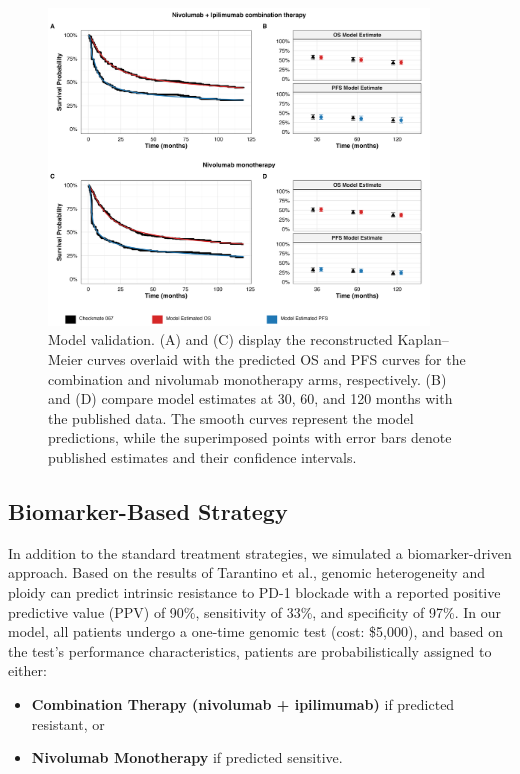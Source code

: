 \documentclass[preprint, 3p,
authoryear]{elsarticle} %
\begin{document}
\begin{figure}[h]
\centering
\includegraphics[width=0.9\textwidth]{../outputs/survival_curves.png}
\caption{Model validation. (A) and (C) display the reconstructed Kaplan–Meier curves overlaid with the predicted OS and PFS curves for the combination and nivolumab monotherapy arms, respectively. (B) and (D) compare model estimates at 30, 60, and 120 months with the published data. The smooth curves represent the model predictions, while the superimposed points with error bars denote published estimates and their confidence intervals.}
\label{fig:validation}
\end{figure}

\subsection{Biomarker-Based Strategy}\label{biomarker-based-strategy}

In addition to the standard treatment strategies, we simulated a
biomarker-driven approach. Based on the results of Tarantino et al.,
genomic heterogeneity and ploidy can predict intrinsic resistance to
PD-1 blockade with a reported positive predictive value (PPV) of 90\%,
sensitivity of 33\%, and specificity of 97\%. In our model, all patients
undergo a one-time genomic test (cost: \$5,000), and based on the test's
performance characteristics, patients are probabilistically assigned to
either:

\begin{itemize}
\item
  \textbf{Combination Therapy (nivolumab + ipilimumab)} if predicted
  resistant, or
\item
  \textbf{Nivolumab Monotherapy} if predicted sensitive.
\end{itemize}
\end{document}
